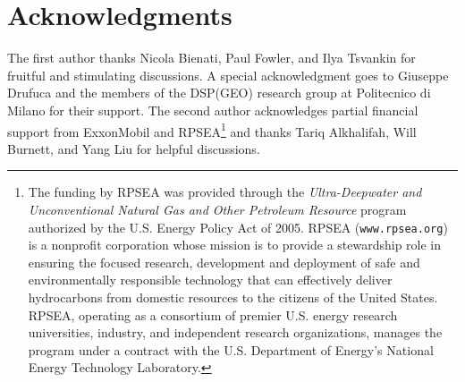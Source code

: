 \section{Acknowledgments}
The first author thanks Nicola Bienati, Paul Fowler, and Ilya Tsvankin
for fruitful and stimulating discussions. A special acknowledgment
goes to Giuseppe Drufuca and the members of the DSP(GEO) research
group at Politecnico di Milano for their support.  The second author
acknowledges partial financial support from ExxonMobil and
RPSEA\footnote{The funding by RPSEA was provided through the
\emph{Ultra-Deepwater and Unconventional Natural Gas and Other
Petroleum Resource} program authorized by the U.S. Energy Policy Act
of 2005.  RPSEA (\texttt{www.rpsea.org}) is a nonprofit corporation
whose mission is to provide a stewardship role in ensuring the focused
research, development and deployment of safe and environmentally
responsible technology that can effectively deliver hydrocarbons from
domestic resources to the citizens of the United States.  RPSEA,
operating as a consortium of premier U.S. energy research
universities, industry, and independent research organizations,
manages the program under a contract with the U.S. Department of
Energy's National Energy Technology Laboratory.} and thanks Tariq
Alkhalifah, Will Burnett, and Yang Liu for helpful
discussions. 


